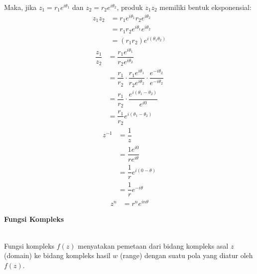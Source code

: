 \documentclass{article}
\begin{document}
Maka, jika $z_1 = r_1e^{i\theta_1}$ dan $z_2 = r_2e^{i\theta_2}$, produk $z_1z_2$ memiliki bentuk eksponensial:
\begin{align}
    z_1z_2 & = r_1e^{i\theta_1} r_2e^{i\theta_2}
    \nonumber                                    \\
           & = r_1r_2e^{i\theta_1}e^{i\theta_2}
    \nonumber                                    \\
           & = (r_1r_2)e^{i(\theta_1\theta_2)}
\end{align}
\begin{align}
    \dfrac{z_1}{z_2} & = \dfrac{r_1e^{i\theta_1}}{r_2e^{i\theta_2}}
    \nonumber                                                                                                                           \\
                     & = \dfrac{r_1}{r_2} \cdot \dfrac{r_1e^{i\theta_1}}{r_2e^{i\theta_2}} \cdot \dfrac{e^{-i\theta_2}}{e^{-i\theta_2}}
    \nonumber                                                                                                                           \\
                     & = \dfrac{r_1}{r_2} \cdot \dfrac{e^{i(\theta_1-\theta_2)}}{e^{i0}}
    \nonumber                                                                                                                           \\
                     & = \dfrac{r_1}{r_2} e^{i(\theta_1-\theta_2)}
\end{align}
\begin{align}
    z^{-1} & = \dfrac{1}{z}
    \nonumber                                \\
           & = \dfrac{1e^{i0}}{re^{i\theta}}
    \nonumber                                \\
           & = \dfrac{1}{r} e^{i(0-\theta)}
    \nonumber                                \\
           & = \dfrac{1}{r} e^{-i\theta}
\end{align}
\begin{align}
    z^n & = r^n e^{in\theta}
\end{align}

\newpage
\begin{center}
    \textbf{Fungsi Kompleks}
\end{center}
\leavevmode\\

Fungsi kompleks $f(z)$ menyatakan pemetaan dari bidang kompleks asal $z$ (domain) ke bidang kompleks hasil $w$ (range) dengan suatu pola yang diatur oleh $f(z)$.
\\
\end{document}
